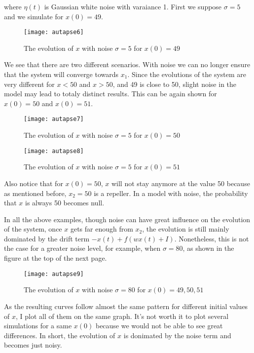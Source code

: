 \noindent
where $\eta(t)$ is Gaussian white noise with varaiance 1. First we suppose 
$\sigma = 5$ and we simulate for $x(0) = 49$.

\vspace{-1em}
\begin{figure}[H]
  \centering
  \texttt{[image: autapse6]}
  \caption{The evolution of $x$ with noise $\sigma = 5$ for $x(0) = 49$}
\end{figure}

We see that there are two different scenarios. With noise we can no longer
ensure that the system will converge towards $x_1$. Since the evolutions of
the system are very different for $x < 50$ and $x > 50$, and 49 is close
to 50, slight noise in the model may lead to totaly distinct results. This can
be again shown for $x(0) = 50$ and $x(0) = 51$.

\vspace{-1em}
\begin{figure}[H]
  \centering
  \texttt{[image: autapse7]}
  \caption{The evolution of $x$ with noise $\sigma = 5$ for $x(0) = 50$}
\end{figure}

\vspace{-1em}
\begin{figure}[H]
  \centering
  \texttt{[image: autapse8]}
  \caption{The evolution of $x$ with noise $\sigma = 5$ for $x(0) = 51$}
\end{figure}

Also notice that for $x(0) = 50$, $x$ will not stay anymore at the value 50 
because as mentioned before, $x_2 = 50$ is a repeller. In a model with noise,
the probability that $x$ is always 50 becomes null. 

In all the above examples, though noise can have great influence on the 
evolution of the system, once $x$ gets far enough from $x_2$, the evolution
is still mainly dominated by the drift term $-x(t) + f(wx(t)+I)$.
Nonetheless, this is not the case for a greater noise level, for example,
when $\sigma = 80$, as shown in the figure at the top of the next page.

\vspace{-1em}
\begin{figure}[H]
  \centering
  \texttt{[image: autapse9]}
  \caption
    {The evolution of $x$ with noise $\sigma = 80$ for $x(0) = 49, 50, 51$}
\end{figure}

As the resulting curves follow almost the same pattern for different 
initial values of $x$, I plot all of them on the same graph. It's not worth
it to plot several simulations for a same $x(0)$ because we would not be able
to see great differences. In short, the evolution of $x$ is donimated by
the noise term and becomes just noisy.

